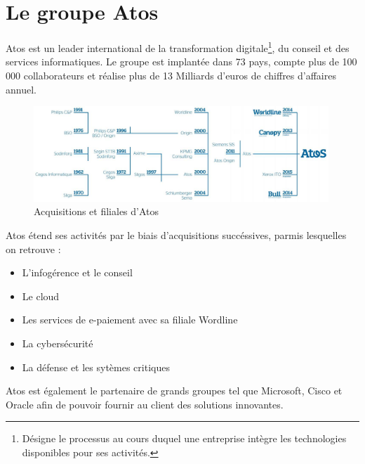 \documentclass[12pt]{report}
\begin{document}
	\newpage
	
	\section{Le groupe Atos}
	Atos est un leader international de la transformation digitale\footnote{Désigne le processus au cours duquel une entreprise intègre les technologies disponibles pour ses activités.}, du conseil et des services informatiques.
	Le groupe est implantée dans 73 pays, compte plus de 100 000 collaborateurs et réalise plus de 13 Milliards d'euros de chiffres d'affaires annuel.
	
	\begin{figure}[ht]
	    \centering
	    \includegraphics[width=0.99\textwidth]{img/Atos_acquisition_filiale.png}
	    \caption{Acquisitions et filiales d'Atos\cite{TweetAtosAcquisition}}
	    \label{fig:atos_acquisition}
	\end{figure}
	
	Atos étend ses activités par le biais d'acquisitions succéssives, parmis lesquelles on retrouve :\vspace{-1.5em}
	\begin{itemize}[itemsep=-0.5em]
	    \item L'infogérence et le conseil
	    \item Le cloud
	    \item Les services de e-paiement avec sa filiale Wordline
	    \item La cybersécurité
	    \item La défense et les sytèmes critiques
	\end{itemize}
	
	Atos est également le partenaire de grands groupes tel que Microsoft, Cisco et Oracle afin de pouvoir fournir au client des solutions innovantes.
	
	\newpage
	
\end{document}
